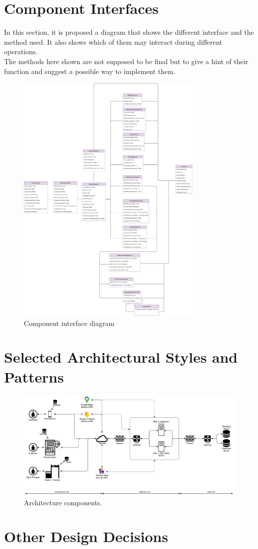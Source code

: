 \section{Component Interfaces}
In this section, it is proposed a diagram that shows the different interface and the method used. It also shows which of them may interact during different operations. \\
The methods here shown are not supposed to be final but to give a hint of their function and suggest a possible way to implement them. 
\begin{figure}[H]
	\centering
	\includegraphics[width=0.8\textwidth]{images/Component_class_diagram.png}
	\caption{Component interface diagram}\label{fig:Component interface diagram}
\end{figure}

\section{Selected Architectural Styles and Patterns}

\begin{figure}[H] %
	\centering
	\includegraphics[width=1.0\textwidth]{images/architecture_components.pdf}
	\caption{Architecture components.}
\end{figure} %

\section{Other Design Decisions}
